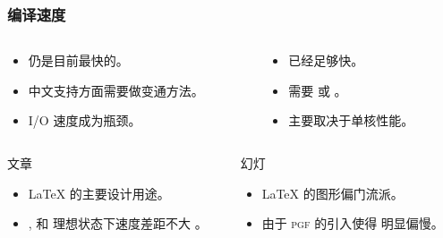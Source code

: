 \begin{frame}
  \frametitle{编译速度}
  \begin{columns}
    \begin{column}{0.5\textwidth}
      \begin{exampleblock}{\faWindows}
        \begin{itemize}
          \item {} 仍是目前最快的。
          \item 中文支持方面需要做变通方法。
          \item I/O 速度成为瓶颈。
        \end{itemize}
      \end{exampleblock}
    \end{column}
    \begin{column}{0.5\textwidth}
      \begin{exampleblock}{\faLinux{} \faApple}
        \begin{itemize}
          \item {} 已经足够快。
          \item \CTeX{} 需要  或 。
          \item 主要取决于单核性能。
        \end{itemize}
      \end{exampleblock}
    \end{column}
  \end{columns}
  \begin{columns}
    \begin{column}{0.5\textwidth}
      \begin{block}{文章}
        \begin{itemize}
          \item \LaTeX{} 的主要设计用途。
          \item {},  和  理想状态下速度差距不大 。
        \end{itemize}
      \end{block}
    \end{column}
    \begin{column}{0.5\textwidth}
      \begin{block}{幻灯}
        \begin{itemize}
          \item \LaTeX{} 的图形偏门流派。
          \item 由于 \textsc{pgf} 的引入使得  明显偏慢。
        \end{itemize}
      \end{block}
    \end{column}
  \end{columns}


\end{frame}


